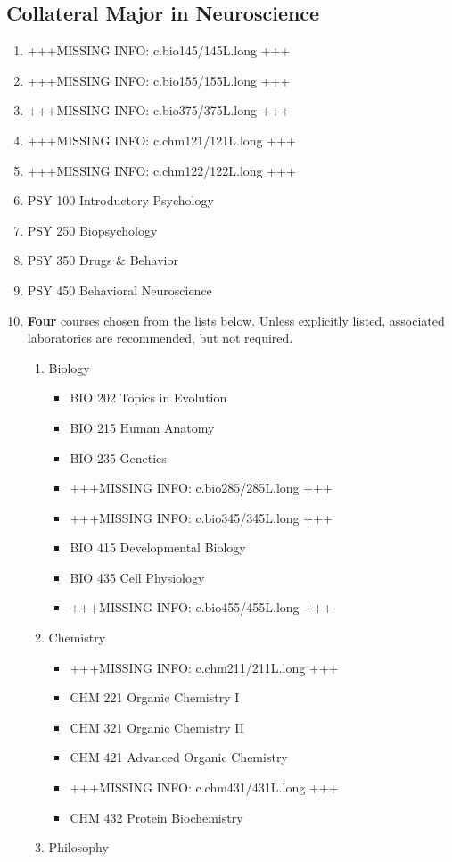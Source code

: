 \documentclass[
  letterpaper,
]{scrbook}
\providecommand{\tightlist}{%
  \setlength{\itemsep}{0pt}\setlength{\parskip}{0pt}}
\begin{document}
\subsection{Collateral Major in
Neuroscience}\label{collateral-major-in-neuroscience}

\begin{enumerate}
\def\labelenumi{\arabic{enumi}.}
\tightlist
\item
  +++MISSING INFO: c.bio145/145L.long +++
\item
  +++MISSING INFO: c.bio155/155L.long +++
\item
  +++MISSING INFO: c.bio375/375L.long +++
\item
  +++MISSING INFO: c.chm121/121L.long +++
\item
  +++MISSING INFO: c.chm122/122L.long +++
\item
  PSY 100 Introductory Psychology
\item
  PSY 250 Biopsychology
\item
  PSY 350 Drugs \& Behavior
\item
  PSY 450 Behavioral Neuroscience
\item
  \textbf{Four} courses chosen from the lists below. Unless explicitly
  listed, associated laboratories are recommended, but not required.

  \begin{enumerate}
  \def\labelenumii{\alph{enumii}.}
  \tightlist
  \item
    Biology

    \begin{itemize}
    \tightlist
    \item
      BIO 202 Topics in Evolution
    \item
      BIO 215 Human Anatomy
    \item
      BIO 235 Genetics
    \item
      +++MISSING INFO: c.bio285/285L.long +++
    \item
      +++MISSING INFO: c.bio345/345L.long +++
    \item
      BIO 415 Developmental Biology
    \item
      BIO 435 Cell Physiology
    \item
      +++MISSING INFO: c.bio455/455L.long +++
    \end{itemize}
  \item
    Chemistry

    \begin{itemize}
    \tightlist
    \item
      +++MISSING INFO: c.chm211/211L.long +++
    \item
      CHM 221 Organic Chemistry I
    \item
      CHM 321 Organic Chemistry II
    \item
      CHM 421 Advanced Organic Chemistry
    \item
      +++MISSING INFO: c.chm431/431L.long +++
    \item
      CHM 432 Protein Biochemistry
    \end{itemize}
  \item
    Philosophy


\end{enumerate}
\end{enumerate}
\end{document}
